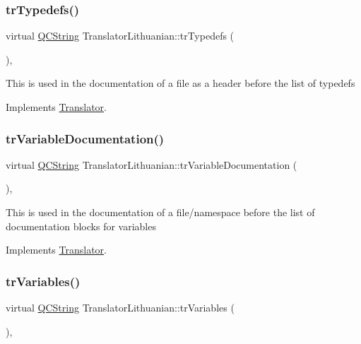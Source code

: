 \subsubsection{\texorpdfstring{trTypedefs()}{trTypedefs()}}
{\footnotesize\ttfamily virtual \mbox{\hyperlink{class_q_c_string}{Q\+C\+String}} Translator\+Lithuanian\+::tr\+Typedefs (\begin{DoxyParamCaption}{ }\end{DoxyParamCaption})\hspace{0.3cm}{\ttfamily [inline]}, {\ttfamily [virtual]}}

This is used in the documentation of a file as a header before the list of typedefs 

Implements \mbox{\hyperlink{class_translator}{Translator}}.

\mbox{\label{class_translator_lithuanian_aa01f521a4109f4225b0a2758192be5df}} 
\subsubsection{\texorpdfstring{trVariableDocumentation()}{trVariableDocumentation()}}
{\footnotesize\ttfamily virtual \mbox{\hyperlink{class_q_c_string}{Q\+C\+String}} Translator\+Lithuanian\+::tr\+Variable\+Documentation (\begin{DoxyParamCaption}{ }\end{DoxyParamCaption})\hspace{0.3cm}{\ttfamily [inline]}, {\ttfamily [virtual]}}

This is used in the documentation of a file/namespace before the list of documentation blocks for variables 

Implements \mbox{\hyperlink{class_translator}{Translator}}.

\mbox{\label{class_translator_lithuanian_a0ec4ff6c7802c9101799dc0b8b4d3273}} 
\subsubsection{\texorpdfstring{trVariables()}{trVariables()}}
{\footnotesize\ttfamily virtual \mbox{\hyperlink{class_q_c_string}{Q\+C\+String}} Translator\+Lithuanian\+::tr\+Variables (\begin{DoxyParamCaption}{ }\end{DoxyParamCaption})\hspace{0.3cm}{\ttfamily [inline]}, {\ttfamily [virtual]}}

